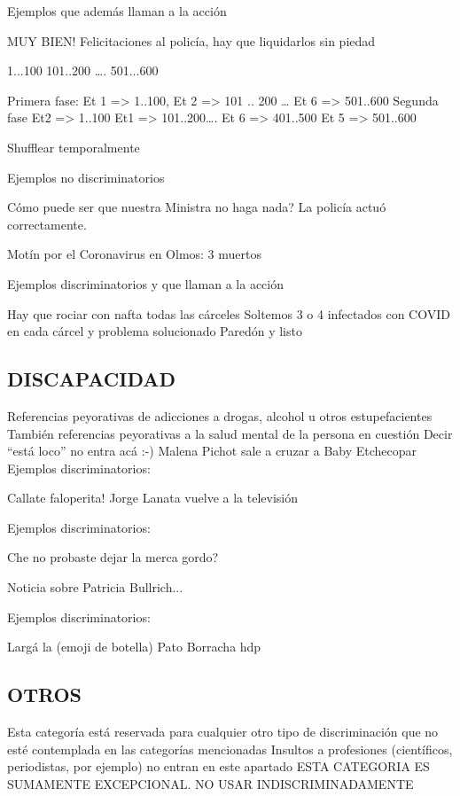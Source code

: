 Ejemplos que además llaman a la acción

MUY BIEN! Felicitaciones al policía, hay que liquidarlos sin piedad


1...100 101..200 …. 501...600

Primera fase: Et 1 => 1..100, Et 2 => 101 .. 200 … Et 6 => 501..600
Segunda fase Et2 => 1..100 Et1 => 101..200…. Et 6 => 401..500 Et 5 => 501..600

Shufflear temporalmente

Ejemplos no discriminatorios


Cómo puede ser que nuestra Ministra no haga nada?
La policía actuó correctamente. 

Motín por el Coronavirus en Olmos: 3 muertos

Ejemplos discriminatorios y que llaman a la acción

Hay que rociar con nafta todas las cárceles
Soltemos 3 o 4 infectados con COVID en cada cárcel y problema solucionado
Paredón y listo



\subsection{DISCAPACIDAD}

Referencias peyorativas de adicciones a drogas, alcohol u otros estupefacientes
También referencias peyorativas a la salud mental de la persona en cuestión
Decir “está loco” no entra acá :-)
Malena Pichot sale a cruzar a Baby Etchecopar
Ejemplos discriminatorios:

Callate faloperita!
Jorge Lanata vuelve a la televisión 

Ejemplos discriminatorios:

Che no probaste dejar la merca gordo?

Noticia sobre Patricia Bullrich...

Ejemplos discriminatorios:

Largá la (emoji de botella) Pato
Borracha hdp



\subsection{OTROS}

Esta categoría está reservada para cualquier otro tipo de discriminación que no esté contemplada en las categorías mencionadas
Insultos a profesiones (científicos, periodistas, por ejemplo) no entran en este apartado
ESTA CATEGORIA ES SUMAMENTE EXCEPCIONAL. NO USAR INDISCRIMINADAMENTE
